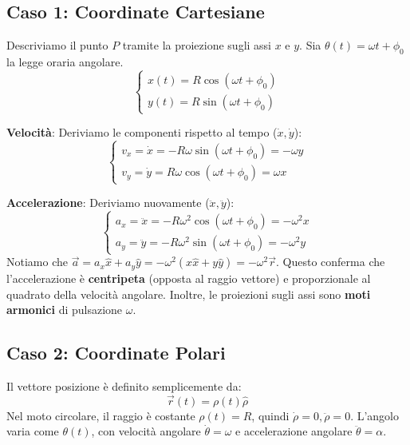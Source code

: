 \subsection{Caso 1: Coordinate Cartesiane}
Descriviamo il punto $P$ tramite la proiezione sugli assi $x$ e $y$.
Sia $\theta(t) = \omega t + \phi_0$ la legge oraria angolare.
\begin{equation}
    \begin{cases}
    x(t) = R \cos(\omega t + \phi_0) \\
    y(t) = R \sin(\omega t + \phi_0)
\end{cases}
\end{equation}

\textbf{Velocità}: Deriviamo le componenti rispetto al tempo ($\dot{x}, \dot{y}$):
\begin{equation}
    \begin{cases}
    v_x = \dot{x} = -R\omega \sin(\omega t + \phi_0) = -\omega y \\
    v_y = \dot{y} = R\omega \cos(\omega t + \phi_0) = \omega x
\end{cases}
\end{equation}

\textbf{Accelerazione}: Deriviamo nuovamente ($\ddot{x}, \ddot{y}$):
\begin{equation}
    \begin{cases}
    a_x = \ddot{x} = -R\omega^2 \cos(\omega t + \phi_0) = -\omega^2 x \\
    a_y = \ddot{y} = -R\omega^2 \sin(\omega t + \phi_0) = -\omega^2 y
\end{cases}
\end{equation}
Notiamo che $\vec{a} = a_x \hat{x} + a_y \hat{y} = -\omega^2 (x\hat{x} + y\hat{y}) = -\omega^2 \vec{r}$.
Questo conferma che l'accelerazione è \textbf{centripeta} (opposta al raggio vettore) e proporzionale al quadrato della velocità angolare. Inoltre, le proiezioni sugli assi sono \textbf{moti armonici} di pulsazione $\omega$.

\subsection{Caso 2: Coordinate Polari}
Il vettore posizione è definito semplicemente da:
\begin{equation}
    \vec{r}(t) = \rho(t) \hat{\rho}
\end{equation}
Nel moto circolare, il raggio è costante $\rho(t) = R$, quindi $\dot{\rho} = 0, \ddot{\rho} = 0$.
L'angolo varia come $\theta(t)$, con velocità angolare $\dot{\theta} = \omega$ e accelerazione angolare $\ddot{\theta} = \alpha$.

